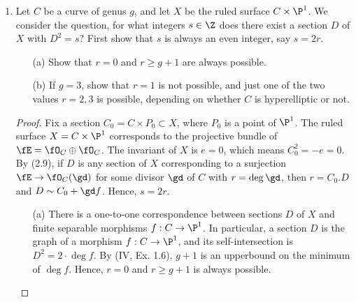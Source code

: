 \documentclass[a4paper]{article}
\begin{document}
\begin{enumerate} [label=\textbf{\arabic*.}, leftmargin=0em]
\begin{proof}
\begin{itemize} [leftmargin=0cm]
                  \item[(b)] Suppose we have an exact sequence
                        \[ \begin{tikzcd}
                                0 \arrow[r] & \fL \arrow[r] & \Omega \arrow[r] & \fM \arrow[r] & 0,
                            \end{tikzcd} \]
                        where $\fL$ and $\fM$ are invertible sheaves on $\P^2$.
                        Then $\cH^1(\fL), \cH^1(\fM) = 0$, so by the long exact sequence in cohomology, we have $\cH^1(\Omega) = 0$.
                        But by (III, Ex. 7.2), $\cH^1(\Omega) = k$, a contradiction.
              \end{itemize}
          \end{proof}

    \item Let $C$ be a curve of genus $g$, and let $X$ be the ruled surface $C \times \P^1$.
          We consider the question, for what integers $s \in \Z$ does there exist a section $D$ of $X$ with $D^2 = s$?
          First show that $s$ is always an even integer, say $s = 2r$.
          \begin{itemize}
              \item[(a)] Show that $r = 0$ and $r \geq g + 1$ are always possible.
              \item[(b)] If $g = 3$, show that $r = 1$ is not possible, and just one of the two values $r = 2, 3$ is possible, depending on whether $C$ is hyperelliptic or not.
          \end{itemize}

          \begin{proof}
              Fix a section $C_0 = C \times P_0 \subset X$, where $P_0$ is a point of $\P^1$.
              The ruled surface $X = C \times \P^1$ corresponds to the projective bundle of $\fE = \fO_C \oplus \fO_C$.
              The invariant of $X$ is $e = 0$, which means $C_0^2 = -e = 0$.
              By (2.9), if $D$ is any section of $X$ corresponding to a surjection $\fE \to \fO_C(\gd)$ for some divisor $\gd$ of $C$ with $r = \deg \gd$, then $r = C_0.D$ and $D \sim C_0 + \gd f$.
              Hence, $s = 2r$.

              \begin{itemize} [leftmargin=0cm]
                  \item[(a)] There is a one-to-one correspondence between sections $D$ of $X$ and finite separable morphisms $f : C \to \P^1$.
                        In particular, a section $D$ is the graph of a morphism $f : C \to \P^1$, and its self-intersection is $D^2 = 2 \cdot \deg{f}$.
                        By (IV, Ex. 1.6), $g + 1$ is an upperbound on the minimum of $\deg{f}$.
                        Hence, $r = 0$ and $r \geq g + 1$ is always possible.


\end{itemize}
\end{proof}
\end{enumerate}
\end{document}
